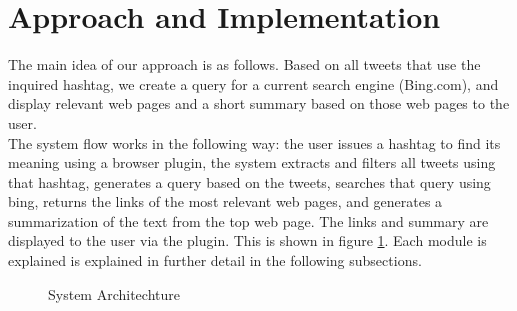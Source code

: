 \documentclass{sig-alternate}
\begin{document}
\section{Approach and Implementation}
\label{sec:implementation}
The main idea of our approach is as follows. Based on all tweets that use the inquired hashtag, we create a query for a current search engine (Bing.com), and display relevant web pages and a short summary based on those web pages to the user. \\
The system flow works in the following way: the user issues a hashtag to find its meaning using a browser plugin, the system extracts and filters all tweets using that hashtag, generates a query based on the tweets, searches that query using bing, returns the links of the most relevant web pages, and generates a summarization of the text from the top web page. The links and summary are displayed to the user via the plugin. This is shown in figure \ref{fig:SystemArchitechture}. Each module is explained is explained in further detail in the following subsections.

\begin{figure}[h!]
   \caption{System Architechture} \label{fig:SystemArchitechture}
\end{figure}
\end{document}
